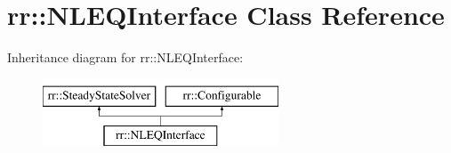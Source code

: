 \hypertarget{classrr_1_1_n_l_e_q_interface}{\section{rr\-:\-:N\-L\-E\-Q\-Interface Class Reference}
\label{classrr_1_1_n_l_e_q_interface}
}
Inheritance diagram for rr\-:\-:N\-L\-E\-Q\-Interface\-:\begin{figure}[H]
\begin{center}
\leavevmode
\includegraphics[height=2.000000cm]{classrr_1_1_n_l_e_q_interface}
\end{center}
\end{figure}
